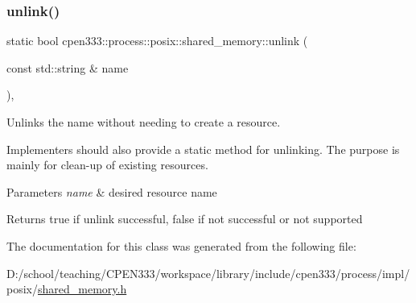 \subsubsection{\texorpdfstring{unlink()}{unlink()}\hspace{0.1cm}{\footnotesize\ttfamily [2/2]}}
{\footnotesize\ttfamily static bool cpen333\+::process\+::posix\+::shared\+\_\+memory\+::unlink (\begin{DoxyParamCaption}\item[{const std\+::string \&}]{name }\end{DoxyParamCaption})\hspace{0.3cm}{\ttfamily [inline]}, {\ttfamily [static]}}



Unlinks the name without needing to create a resource. 

Implementers should also provide a static method for unlinking. The purpose is mainly for clean-\/up of existing resources.


\begin{DoxyParams}{Parameters}
{\em name} & desired resource name \\
\hline
\end{DoxyParams}
\begin{DoxyReturn}{Returns}
{\ttfamily true} if unlink successful, {\ttfamily false} if not successful or not supported 
\end{DoxyReturn}


The documentation for this class was generated from the following file\+:\begin{DoxyCompactItemize}
\item 
D\+:/school/teaching/\+C\+P\+E\+N333/workspace/library/include/cpen333/process/impl/posix/\hyperlink{impl_2posix_2shared__memory_8h}{shared\+\_\+memory.\+h}\end{DoxyCompactItemize}
